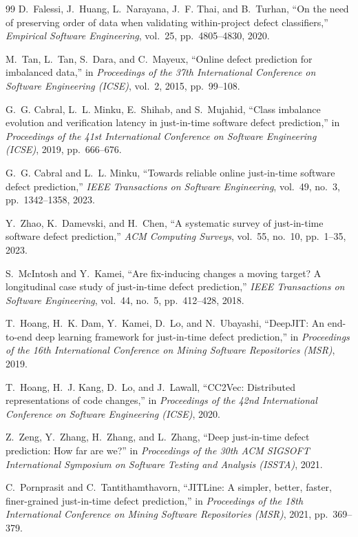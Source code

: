\documentclass[12pt,a4paper,oneside]{report}
\begin{document}
{\begin{thebibliography}{99}
D.~Falessi, J.~Huang, L.~Narayana, J.~F. Thai, and B.~Turhan, ``On the need of
preserving order of data when validating within-project defect classifiers,''
\emph{Empirical Software Engineering}, vol.~25, pp.~4805--4830, 2020.

M.~Tan, L.~Tan, S.~Dara, and C.~Mayeux, ``Online defect prediction for
imbalanced data,'' in \emph{Proceedings of the 37th International Conference on
Software Engineering (ICSE)}, vol.~2, 2015, pp.~99--108.

G.~G. Cabral, L.~L. Minku, E.~Shihab, and S.~Mujahid, ``Class imbalance
evolution and verification latency in just-in-time software defect
prediction,'' in \emph{Proceedings of the 41st International Conference on
Software Engineering (ICSE)}, 2019, pp.~666--676.

G.~G. Cabral and L.~L. Minku, ``Towards reliable online just-in-time software
defect prediction,'' \emph{IEEE Transactions on Software Engineering}, vol.~49,
no.~3, pp.~1342--1358, 2023.

Y.~Zhao, K.~Damevski, and H.~Chen, ``A systematic survey of just-in-time
software defect prediction,'' \emph{ACM Computing Surveys}, vol.~55, no.~10,
pp.~1--35, 2023.

S.~McIntosh and Y.~Kamei, ``Are fix-inducing changes a moving target? A
longitudinal case study of just-in-time defect prediction,'' \emph{IEEE
Transactions on Software Engineering}, vol.~44, no.~5, pp.~412--428, 2018.

T.~Hoang, H.~K. Dam, Y.~Kamei, D.~Lo, and N.~Ubayashi, ``DeepJIT: An end-to-end
deep learning framework for just-in-time defect prediction,'' in
\emph{Proceedings of the 16th International Conference on Mining Software
Repositories (MSR)}, 2019.

T.~Hoang, H.~J. Kang, D.~Lo, and J.~Lawall, ``CC2Vec: Distributed
representations of code changes,'' in \emph{Proceedings of the 42nd
International Conference on Software Engineering (ICSE)}, 2020.

Z.~Zeng, Y.~Zhang, H.~Zhang, and L.~Zhang, ``Deep just-in-time defect
prediction: How far are we?'' in \emph{Proceedings of the 30th ACM SIGSOFT
International Symposium on Software Testing and Analysis (ISSTA)}, 2021.

C.~Pornprasit and C.~Tantithamthavorn, ``JITLine: A simpler, better, faster,
finer-grained just-in-time defect prediction,'' in \emph{Proceedings of the
18th International Conference on Mining Software Repositories (MSR)}, 2021,
pp.~369--379.


\end{thebibliography}}
\end{document}

